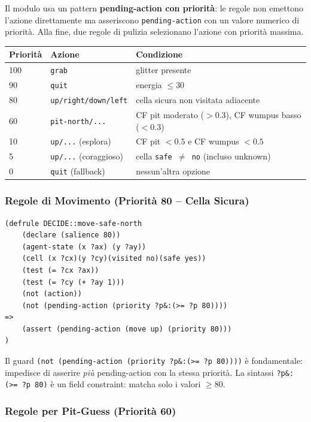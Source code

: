 \documentclass[12pt,a4paper]{article}
\begin{document}
Il modulo usa un pattern \textbf{pending-action con priorità}: le regole non
emettono l'azione direttamente ma asseriscono \texttt{pending-action} con un
valore numerico di priorità. Alla fine, due regole di pulizia selezionano
l'azione con priorità massima.

\begin{center}
\renewcommand{\arraystretch}{1.3}
\begin{tabular}{lll}
\toprule
\textbf{Priorità} & \textbf{Azione} & \textbf{Condizione} \\
\midrule
100 & \texttt{grab} & glitter presente \\
90  & \texttt{quit} & energia $\le 30$ \\
80  & \texttt{up/right/down/left} & cella sicura non visitata adiacente \\
60  & \texttt{pit-north/...} & CF pit moderato ($> 0.3$), CF wumpus basso ($< 0.3$) \\
10  & \texttt{up/...} (esplora) & CF pit $< 0.5$ e CF wumpus $< 0.5$ \\
5   & \texttt{up/...} (coraggioso) & cella \texttt{safe $\neq$ no} (incluso unknown) \\
0   & \texttt{quit} (fallback) & nessun'altra opzione \\
\bottomrule
\end{tabular}
\end{center}

\subsubsection{Regole di Movimento (Priorità 80 -- Cella Sicura)}

\begin{lstlisting}
(defrule DECIDE::move-safe-north
    (declare (salience 80))
    (agent-state (x ?ax) (y ?ay))
    (cell (x ?cx)(y ?cy)(visited no)(safe yes))
    (test (= ?cx ?ax))
    (test (= ?cy (+ ?ay 1)))
    (not (action))
    (not (pending-action (priority ?p&:(>= ?p 80))))
=>
    (assert (pending-action (move up) (priority 80)))
)
\end{lstlisting}

Il guard \texttt{(not (pending-action (priority ?p\&:(>= ?p 80))))} è fondamentale:
impedisce di asserire \emph{più} pending-action con la stessa priorità. La
sintassi \texttt{?p\&:(>= ?p 80)} è un field constraint: matcha solo i valori
$\ge 80$.

\subsubsection{Regole per Pit-Guess (Priorità 60)}
\end{document}
